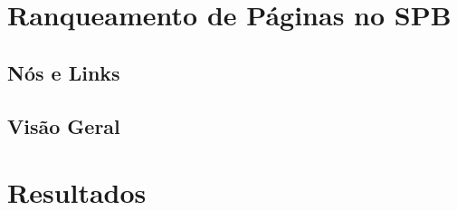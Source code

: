 \section{Ranqueamento de Páginas no SPB}
\label{est:ran}

\subsection{Nós e Links}
\label{est:ran:nos}

\subsection{Visão Geral}
\label{est:ran:vis}

\section{Resultados}
\label{est:res}
